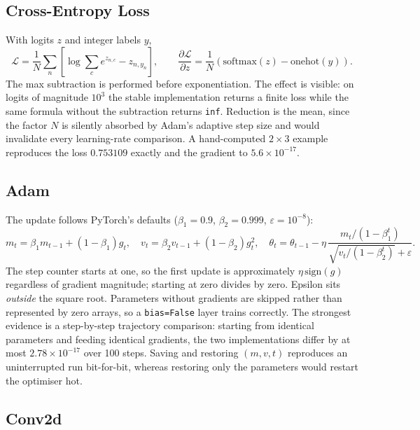 \subsection{Cross-Entropy Loss}

With logits $z$ and integer labels $y$,
\begin{equation}
\mathcal{L} = \frac{1}{N}\sum_n\left[\log\sum_c e^{z_{n,c}} - z_{n,y_n}\right], \qquad
\frac{\partial\mathcal{L}}{\partial z} = \frac{1}{N}\left(\mathrm{softmax}(z)-\mathrm{onehot}(y)\right).
\end{equation}
The max subtraction is performed before exponentiation. The effect is visible: on logits of magnitude
$10^3$ the stable implementation returns a finite loss while the same formula without the subtraction
returns \texttt{inf}. Reduction is the mean, since the factor $N$ is silently absorbed by Adam's
adaptive step size and would invalidate every learning-rate comparison. A hand-computed $2\times3$
example reproduces the loss $0.753109$ exactly and the gradient to $5.6\times10^{-17}$.

\subsection{Adam}

The update follows PyTorch's defaults ($\beta_1=0.9$, $\beta_2=0.999$, $\varepsilon=10^{-8}$):
\begin{equation}
m_t=\beta_1 m_{t-1}+(1-\beta_1)g_t,\quad
v_t=\beta_2 v_{t-1}+(1-\beta_2)g_t^2,\quad
\theta_t=\theta_{t-1}-\eta\,\frac{m_t/(1-\beta_1^t)}{\sqrt{v_t/(1-\beta_2^t)}+\varepsilon}.
\end{equation}
The step counter starts at one, so the first update is approximately $\eta\,\mathrm{sign}(g)$
regardless of gradient magnitude; starting at zero divides by zero. Epsilon sits \emph{outside} the
square root. Parameters without gradients are skipped rather than represented by zero arrays, so a
\texttt{bias=False} layer trains correctly. The strongest evidence is a step-by-step trajectory
comparison: starting from identical parameters and feeding identical gradients, the two
implementations differ by at most $2.78\times10^{-17}$ over 100 steps. Saving and restoring
$(m,v,t)$ reproduces an uninterrupted run bit-for-bit, whereas restoring only the parameters would
restart the optimiser hot.

\subsection{Conv2d}

